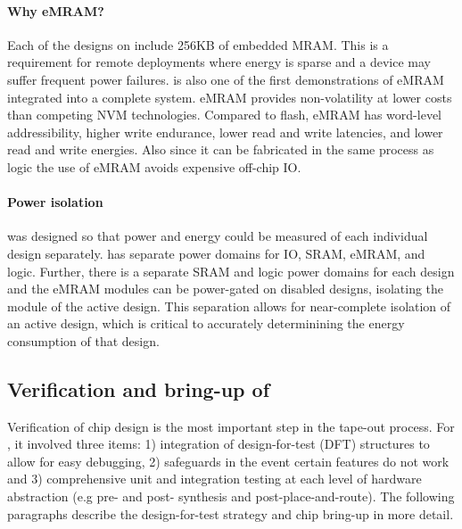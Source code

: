 \paragraph{Why eMRAM?}
Each of the designs on \msilicon include 256KB of embedded MRAM.
% 
This is a requirement for remote deployments where energy is sparse and a device may suffer frequent power failures.
% 
\msilicon is also one of the first demonstrations of eMRAM integrated into a complete system.
% 
eMRAM provides non-volatility at lower costs than competing NVM technologies.
% 
Compared to flash, eMRAM has word-level addressibility, higher write endurance, lower read and write latencies, and lower read and write energies.
% 
Also since it can be fabricated in the same process as logic the use of eMRAM avoids expensive off-chip IO.

\paragraph{Power isolation}
\msilicon was designed so that power and energy could be measured of each individual design separately.
% 
\msilicon has separate power domains for IO, SRAM, eMRAM, and logic.
% 
Further, there is a separate SRAM and logic power domains for each design and the eMRAM modules can be power-gated on disabled designs, isolating the module of the active design.
% 
This separation allows for near-complete isolation of an active design, which is critical to accurately determinining the energy consumption of that design.

\subsection{Verification and bring-up of \msilicon}
Verification of chip design is the most important step in the tape-out process.
% 
% 
For \msilicon, it involved three items: 1) integration of design-for-test (DFT) structures to allow for easy debugging, 2) safeguards in the event certain features do not work and 3) comprehensive unit and integration testing at each level of hardware abstraction (e.g pre- and post- synthesis and post-place-and-route).
% 
The following paragraphs describe the design-for-test strategy and chip bring-up in more detail.

